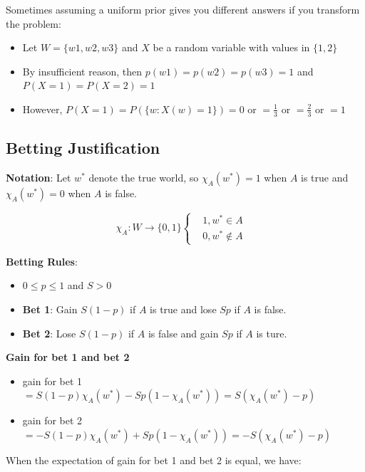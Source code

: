\documentclass{article}
\begin{document}
Sometimes assuming a uniform prior gives you different answers if you transform the problem:

\begin{itemize}
    \item Let $W = \{w1, w2, w3\}$ and $X$ be a random variable with values in $\{1, 2\}$
    \item By insufficient reason, then $p(w1) = p(w2) = p(w3) = 1$ and $P(X=1)=P(X=2)= 1$
    \item However, $P(X=1)=P(\{w:X(w)=1\})=0$ or $=\frac{1}{3}$ or $=\frac{2}{3}$ or $= 1$
\end{itemize}


\subsection{Betting Justification}

\textbf{Notation}: Let $w^*$ denote the true world, so $\chi_A(w^*) = 1$ when $A$ is true and $\chi_A(w^*) = 0$ when $A$ is false.

\begin{equation}
    \chi_A: W \rightarrow \{0, 1\} \left\{\begin{matrix} &1, w^* \in A  & \\  & 0, w^* \notin A  &\end{matrix}\right.
\end{equation}

\textbf{Betting Rules}:

\begin{itemize}
    \item $0 \leq p \leq 1$ and $S > 0$
    \item \textbf{Bet 1}: Gain $S(1-p)$ if $A$ is true and lose $Sp$ if $A$ is false.
    \item \textbf{Bet 2}: Lose $S(1-p)$ if $A$ is false and gain $Sp$ if $A$ is ture.
\end{itemize}

\textbf{Gain for bet 1 and bet 2}

\begin{itemize}
    \item gain for bet 1 $= S(1-p)\chi_A(w^*) - Sp(1-\chi_A(w^*)) = S(\chi_A(w^*)-p)$
    \item gain for bet 2 $= -S(1-p)\chi_A(w^*) + Sp(1-\chi_A(w^*)) = -S(\chi_A(w^*)-p)$
\end{itemize}

When the expectation of gain for bet 1 and bet 2 is equal, we have:
\end{document}
